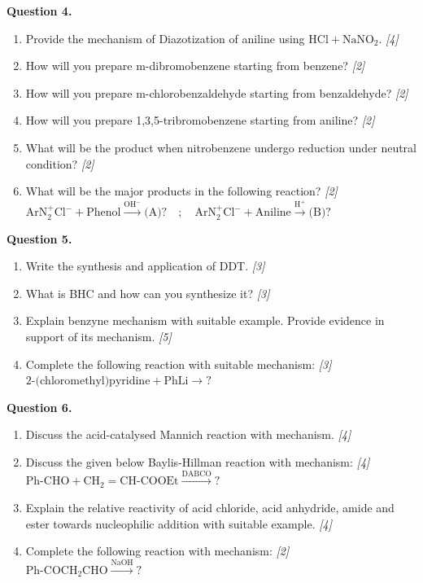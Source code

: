 \documentclass[11pt,a4paper]{article}
\newcommand{\pts}[1]{\hfill \textit{[#1]}}
\begin{document}
\noindent \textbf{Question 4.}
\begin{enumerate}[label=(\alph*)]
  \item Provide the mechanism of Diazotization of aniline using $\text{HCl}+\text{NaNO}_2$. \pts{4}
  \item How will you prepare m-dibromobenzene starting from benzene? \pts{2}
  \item How will you prepare m-chlorobenzaldehyde starting from benzaldehyde? \pts{2}
  \item How will you prepare 1,3,5-tribromobenzene starting from aniline? \pts{2}
  \item What will be the product when nitrobenzene undergo reduction under neutral condition? \pts{2}
  \item What will be the major products in the following reaction? \pts{2}\\
  $\text{ArN}_2^+\text{Cl}^- + \text{Phenol} \xrightarrow{\text{OH}^-} \text{(A)?} \quad;\quad \text{ArN}_2^+\text{Cl}^- + \text{Aniline} \xrightarrow{\text{H}^+} \text{(B)?}$
\end{enumerate}

\bigskip

\noindent \textbf{Question 5.}
\begin{enumerate}[label=(\alph*)]
  \item Write the synthesis and application of DDT. \pts{3}
  \item What is BHC and how can you synthesize it? \pts{3}
  \item Explain benzyne mechanism with suitable example. Provide evidence in support of its mechanism. \pts{5}
  \item Complete the following reaction with suitable mechanism: \pts{3}\\
  $\text{2-(chloromethyl)pyridine} + \text{PhLi} \rightarrow ?$
\end{enumerate}

\bigskip

\noindent \textbf{Question 6.}
\begin{enumerate}[label=(\alph*)]
  \item Discuss the acid-catalysed Mannich reaction with mechanism. \pts{4}
  \item Discuss the given below Baylis-Hillman reaction with mechanism: \pts{4}\\
  $\text{Ph-CHO} + \text{CH}_2=\text{CH-COOEt} \xrightarrow{\text{DABCO}} ?$
  \item Explain the relative reactivity of acid chloride, acid anhydride, amide and ester towards nucleophilic addition with suitable example. \pts{4}
  \item Complete the following reaction with mechanism: \pts{2}\\
  $\text{Ph-COCH}_2\text{CHO} \xrightarrow{\text{NaOH}} ?$
\end{enumerate}
\end{document}
